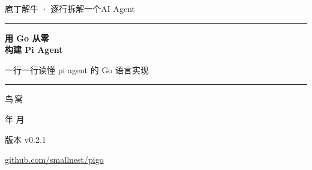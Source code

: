 \begin{titlepage}
\thispagestyle{empty}
\centering
\vspace*{2cm}

{\sffamily\large\color{structurecolor!75} 庖丁解牛 · 逐行拆解一个AI Agent\par}
\vspace{0.5cm}
{\color{accentrule}\rule{0.30\linewidth}{0.8pt}\par}
\vspace{1.5cm}

{\sffamily\bfseries\fontsize{42}{50}\selectfont\color{structurecolor} 用 Go 从零\\[0.25em]构建 Pi Agent\par}
\vspace{1.2cm}

{\Large\sffamily 一行一行读懂 pi agent 的 Go 语言实现\par}

\vspace{1.7cm}
{\color{structurecolor}\rule{0.55\linewidth}{1.4pt}\par}

\vfill

{\LARGE\sffamily 鸟\,窝\par}
\vspace{0.9cm}
{\sffamily\color{black!60} \number\year 年 \number\month 月\par}
\vspace{0.4cm}
{\sffamily\color{structurecolor!85} 版本 v0.2.1\par}
\vspace{0.4cm}
{\small\ttfamily\color{structurecolor} \href{https://github.com/smallnest/pigo}{github.com/smallnest/pigo}\par}
\vspace{1.4cm}
\end{titlepage}

